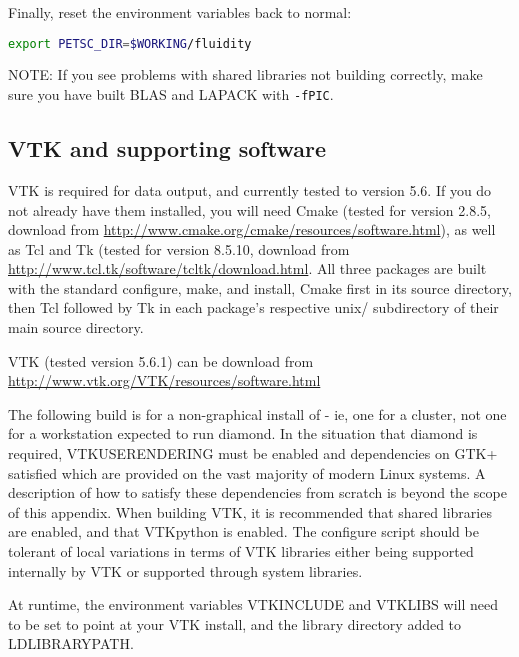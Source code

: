 Finally, reset the environment variables back to normal:

\begin{lstlisting}[language=bash]
export PETSC_DIR=$WORKING/fluidity
\end{lstlisting}

NOTE: If you see problems with shared libraries not building correctly, make
sure you have built BLAS and LAPACK with \lstinline[language=bash]+-fPIC+.

\subsection{VTK and supporting software}
\label{sec:required_libraries_vtk}

VTK is required for \fluidity data output, and currently tested to version 5.6.
If you do not already have them installed, you will need Cmake (tested for
version 2.8.5, download from
\url{http://www.cmake.org/cmake/resources/software.html}), as well as Tcl and
Tk (tested for version 8.5.10, download from
\url{http://www.tcl.tk/software/tcltk/download.html}. All three packages are
built with the standard configure, make, and install, Cmake first in its source
directory, then Tcl followed by Tk in each package's respective unix/
subdirectory of their main source directory.

VTK (tested version 5.6.1) can be download from
\url{http://www.vtk.org/VTK/resources/software.html}

The following build is for a non-graphical install of \fluidity - ie, one for a
cluster, not one for a workstation expected to run diamond. In the situation
that diamond is required, VTK{\textunderscore}USE{\textunderscore}RENDERING
must be enabled and dependencies on GTK+ satisfied which are provided on the
vast majority of modern Linux systems. A description of how to satisfy these
dependencies from scratch is beyond the scope of this appendix. When building
VTK, it is recommended that shared libraries are enabled, and that VTKpython is
enabled. The \fluidity configure script should be tolerant of local variations
in terms of VTK libraries either being supported internally by VTK or supported
through system libraries.

At runtime, the environment variables VTK{\textunderscore}INCLUDE and
VTK{\textunderscore}LIBS will need to be set to point at your VTK install, and
the library directory added to LD{\textunderscore}LIBRARY{\textunderscore}PATH.

